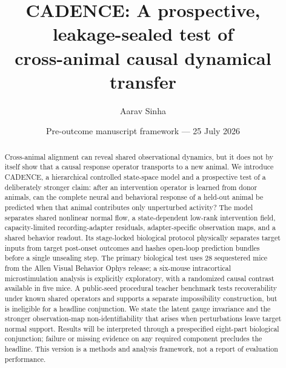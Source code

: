 \documentclass[11pt]{article}
\title{\textbf{CADENCE: A prospective, leakage-sealed test of\\
cross-animal causal dynamical transfer}}
\author{Aarav Sinha}
\date{Pre-outcome manuscript framework --- 25 July 2026}
\begin{document}
\maketitle

\begin{center}
\end{center}

\begin{abstract}
Cross-animal alignment can reveal shared observational dynamics, but it does
not by itself show that a causal response operator transports to a new animal.
We introduce CADENCE, a hierarchical controlled state-space model and a
prospective test of a deliberately stronger claim: after an intervention
operator is learned from donor animals, can the complete neural and behavioral
response of a held-out animal be predicted when that animal contributes only
unperturbed activity? The model separates shared nonlinear normal flow, a
state-dependent low-rank intervention field, capacity-limited recording-adapter
residuals, adapter-specific observation maps, and a shared behavior readout. Its
stage-locked biological protocol physically separates target inputs from
target post-onset outcomes and hashes open-loop prediction bundles before a
single unsealing step. The primary biological test uses 28 sequestered mice from the
Allen Visual Behavior Ophys release; a six-mouse intracortical
microstimulation analysis is explicitly exploratory, with a randomized causal
contrast available in five mice. A public-seed procedural teacher benchmark
tests recoverability under known shared operators and supports a separate
impossibility construction, but is
ineligible for a headline conjunction. We state the latent
gauge invariance and the stronger observation-map non-identifiability that
arises when perturbations leave target normal support. Results will be
interpreted through a prespecified eight-part biological conjunction; failure
or missing evidence on any required component precludes the headline. This
version is a methods and analysis framework, not a report of evaluation
performance.
\end{abstract}
\end{document}
